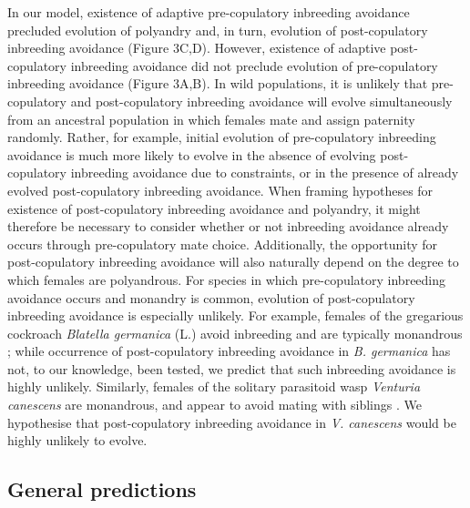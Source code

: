 \documentclass[10pt,letterpaper]{article}
\begin{document}
In our model, existence of adaptive pre-copulatory inbreeding avoidance precluded evolution of polyandry and, in turn, evolution of post-copulatory inbreeding avoidance (Figure 3C,D). However, existence of adaptive post-copulatory inbreeding avoidance did not preclude evolution of pre-copulatory inbreeding avoidance (Figure 3A,B). In wild populations, it is unlikely that pre-copulatory and post-copulatory inbreeding avoidance will evolve simultaneously from an ancestral population in which females mate and assign paternity randomly. Rather, for example, initial evolution of pre-copulatory inbreeding avoidance is much more likely to evolve in the absence of evolving post-copulatory inbreeding avoidance due to constraints, or in the presence of already evolved post-copulatory inbreeding avoidance. When framing hypotheses for existence of post-copulatory inbreeding avoidance and polyandry, it might therefore be necessary to consider whether or not inbreeding avoidance already occurs through pre-copulatory mate choice. Additionally, the opportunity for post-copulatory inbreeding avoidance will also naturally depend on the degree to which females are polyandrous. For species in which pre-copulatory inbreeding avoidance occurs and monandry is common, evolution of post-copulatory inbreeding avoidance is especially unlikely. For example, females of the gregarious cockroach \textit{Blatella germanica} (L.) avoid inbreeding and are typically monandrous \cite[][]{Lihoreau2007}; while occurrence of post-copulatory inbreeding avoidance in \textit{B. germanica} has not, to our knowledge, been tested, we predict that such inbreeding avoidance is highly unlikely. Similarly, females of the solitary parasitoid wasp \textit{Venturia canescens} are monandrous, and appear to avoid mating with siblings \cite[][]{Metzger2010, Metzger2010a}. We hypothesise that post-copulatory inbreeding avoidance in \textit{V. canescens} would be highly unlikely to evolve. 

\subsection*{General predictions}
\end{document}
